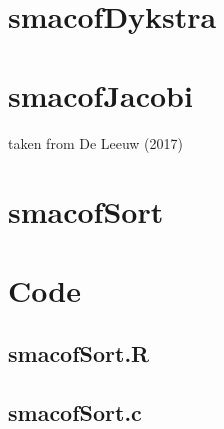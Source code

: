 \documentclass[
  12pt,
]{article}
\begin{document}
\section{smacofDykstra}\label{smacofdykstra}

\section{smacofJacobi}\label{smacofjacobi}

taken from De Leeuw (2017)

\section{smacofSort}\label{smacofsort}

\section{Code}\label{code}

\subsection{smacofSort.R}\label{smacofsort.r}

\subsection{smacofSort.c}\label{smacofsort.c}
\end{document}
